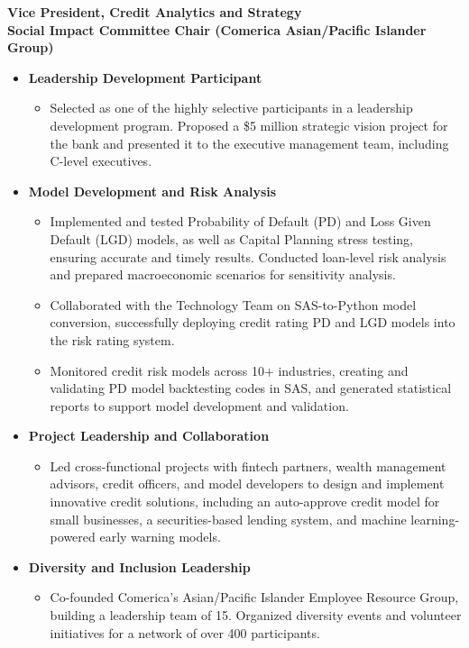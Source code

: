\documentclass{resume}
\begin{document}
\textbf{Vice President, Credit Analytics and Strategy}\\
\textbf{Social Impact Committee Chair (Comerica Asian/Pacific Islander Group)}
\begin{itemize}
    \item \textbf{Leadership Development Participant}  
    \begin{itemize}
        \item Selected as one of the highly selective participants in a leadership development program. Proposed a \$5 million strategic vision project for the bank and presented it to the executive management team, including C-level executives.
    \end{itemize}
    \item \textbf{Model Development and Risk Analysis}  
    \begin{itemize}
        \item Implemented and tested Probability of Default (PD) and Loss Given Default (LGD) models, as well as Capital Planning stress testing, ensuring accurate and timely results. Conducted loan-level risk analysis and prepared macroeconomic scenarios for sensitivity analysis.
        \item Collaborated with the Technology Team on SAS-to-Python model conversion, successfully deploying credit rating PD and LGD models into the risk rating system.
        \item Monitored credit risk models across 10+ industries, creating and validating PD model backtesting codes in SAS, and generated statistical reports to support model development and validation.
    \end{itemize}
    \item \textbf{Project Leadership and Collaboration}  
    \begin{itemize}
        \item Led cross-functional projects with fintech partners, wealth management advisors, credit officers, and model developers to design and implement innovative credit solutions, including an auto-approve credit model for small businesses, a securities-based lending system, and machine learning-powered early warning models.
    \end{itemize}
    \item \textbf{Diversity and Inclusion Leadership}  
    \begin{itemize}
        \item Co-founded Comerica’s Asian/Pacific Islander Employee Resource Group, building a leadership team of 15. Organized diversity events and volunteer initiatives for a network of over 400 participants.
    \end{itemize}
\end{itemize}
\end{document}
